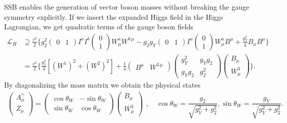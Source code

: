 \acs{SSB} enables the generation of vector boson masses without breaking the gauge symmetry explicitly. If we insert the expanded Higgs field in the Higgs Lagrangian, we get quadratic terms of the gauge boson fields
\begin{equation}
\begin{split}
\mathcal{L}_H &\supsetneq \frac{v^2}{2} \bigg \lbrace g_2^2 \begin{pmatrix} 0 & 1 \end{pmatrix} I^a I^b \begin{pmatrix} 0 \\ 1 \end{pmatrix} W^a_\mu W^{b\, \mu} - g_2 g_Y \begin{pmatrix} 0 & 1 \end{pmatrix} I^a \begin{pmatrix} 0 \\ 1 \end{pmatrix} W_\mu^a B^\mu + \frac{g_Y^2}{4} B_\mu B^\mu \bigg \rbrace \\
&= \frac{v^2}{2} \bigg \lbrace \frac{g_2^2}{4} \left[ (W^1)^2 + (W^2)^2 \right] + \frac{1}{4} \begin{pmatrix} B^\mu & W^{3\, \mu} \end{pmatrix} \begin{pmatrix}  g_Y^2 & g_Y g_2 \\ g_Y g_2 & g_2^2 \end{pmatrix} \begin{pmatrix} B_\mu \\ W^3_\mu \end{pmatrix} \bigg \rbrace.
\end{split}
\end{equation}
By diagonalizing the mass matrix we obtain the physical states
\begin{equation}
\begin{gathered}
\begin{pmatrix}
A^\gamma_\mu \\
Z_\mu
\end{pmatrix} = \begin{pmatrix}
\cos \theta_W & - \sin \theta_W \\
\sin \theta_W & \cos \theta_W
\end{pmatrix} \begin{pmatrix}
B_\mu \\
W_\mu^3
\end{pmatrix}
\end{gathered}, \quad \cos \theta_W = \frac{g_2}{\sqrt{g_Y^2 + g_2^2}}, \sin \theta_W = \frac{g_Y}{\sqrt{g_Y^2 + g_2^2}}.
\end{equation}
